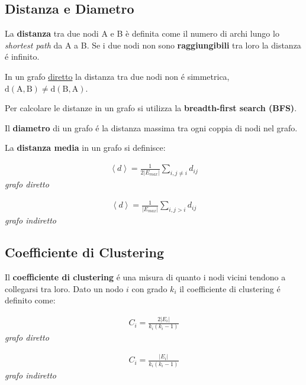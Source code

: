 \subsection*{Distanza e Diametro}
La \textbf{distanza} tra due nodi A e B è definita come il numero di archi lungo lo \textit{shortest path} da A a B.
Se i due nodi non sono \textbf{raggiungibili} tra loro la distanza é infinito.

In un grafo \underline{diretto} la distanza tra due nodi non é simmetrica, $\text{d}(\text{A}, \text{B}) \not= \text{d}(\text{B}, \text{A})$.

Per calcolare le distanze in un grafo si utilizza la \textbf{breadth-first search (BFS)}.

Il \textbf{diametro} di un grafo é la distanza massima tra ogni coppia di nodi nel grafo.

La \textbf{distanza media} in un grafo si definisce:
\\
\begin{minipage}{0.45\textwidth}
  \centering
  \begin{align*}
    \left\langle d \right\rangle = \frac{1}{2|E_{max}|} \sum_{i, j\not=i} d_{ij}
  \end{align*}
  \small\textit{grafo diretto}
\end{minipage}
\hfill
\begin{minipage}{0.45\textwidth}
  \centering
  \begin{align*}
    \left\langle d \right\rangle = \frac{1}{|E_{max}|} \sum_{i, j>i} d_{ij}
  \end{align*}
  \small\textit{grafo indiretto}
\end{minipage}

\subsection*{Coefficiente di Clustering}
Il \textbf{coefficiente di clustering} é una misura di quanto i nodi vicini tendono a collegarsi tra loro.
Dato un nodo $i$ con grado $k_i$ il coefficiente di clustering é definito come:
%
\begin{minipage}{0.45\textwidth}
  \centering

  \begin{align*}
    C_i = \frac{2|E_i|}{k_i (k_i - 1)}
  \end{align*}
  \small\textit{grafo diretto}
\end{minipage}
\hfill
\begin{minipage}{0.45\textwidth}
  \centering
  \begin{align*}
    C_i = \frac{|E_i|}{k_i (k_i - 1)}
  \end{align*}
  \small\textit{grafo indiretto}
\end{minipage}

